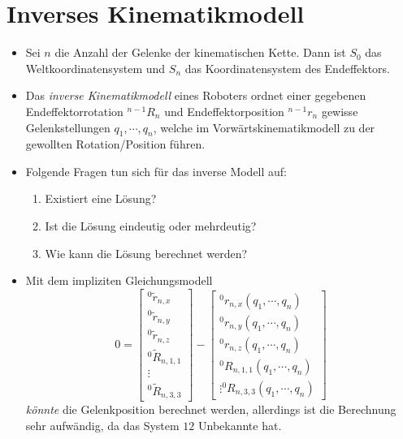 	\section{Inverses Kinematikmodell} %
		\begin{itemize}
			\item Sei \( n \) die Anzahl der Gelenke der kinematischen Kette. Dann ist \( S _ 0 \) das Weltkoordinatensystem und \( S _ n \) das Koordinatensystem des Endeffektors.
			\item Das \textit{inverse Kinematikmodell} eines Roboters ordnet einer gegebenen Endeffektorrotation \( ^{n-1}R_n \) und Endeffektorposition \( ^{n-1}r_n \) gewisse Gelenkstellungen \( q _ 1, \cdots, q _ n \), welche im Vorwärtskinematikmodell zu der gewollten Rotation/Position führen.
			\item Folgende Fragen tun sich für das inverse Modell auf:
				\begin{enumerate}
					\item Existiert eine Lösung?
					\item Ist die Lösung eindeutig oder mehrdeutig?
					\item Wie kann die Lösung berechnet werden?
				\end{enumerate}
			\item Mit dem impliziten Gleichungsmodell
				\begin{equation*}
					0 =
					\begin{bmatrix}
						^0\tilde{r}_{n,x}   \\
						^0\tilde{r}_{n,y}   \\
						^0\tilde{r}_{n,z}   \\
						^0\tilde{R}_{n,1,1} \\
						\vdots              \\
						^0\tilde{R}_{n,3,3}
					\end{bmatrix}
					-
					\begin{bmatrix}
						^0r_{n,x}(q_1, \cdots, q_n)   \\
						^0r_{n,y}(q_1, \cdots, q_n)   \\
						^0r_{n,z}(q_1, \cdots, q_n)   \\
						^0R_{n,1,1}(q_1, \cdots, q_n) \\
						\vdots
						^0R_{n,3,3}(q_1, \cdots, q_n)
					\end{bmatrix}
				\end{equation*}
				\textit{könnte} die Gelenkposition berechnet werden, allerdings ist die Berechnung sehr aufwändig, da das System \(12\) Unbekannte hat.

\end{itemize}
